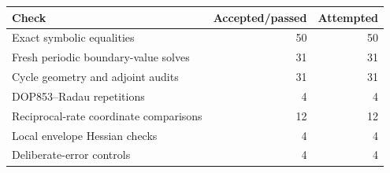 \begin{tabular}{lrr}
\toprule
Check & Accepted/passed & Attempted \\
\midrule
Exact symbolic equalities & 50 & 50 \\
Fresh periodic boundary-value solves & 31 & 31 \\
Cycle geometry and adjoint audits & 31 & 31 \\
DOP853--Radau repetitions & 4 & 4 \\
Reciprocal-rate coordinate comparisons & 12 & 12 \\
Local envelope Hessian checks & 4 & 4 \\
Deliberate-error controls & 4 & 4 \\
\bottomrule
\end{tabular}
